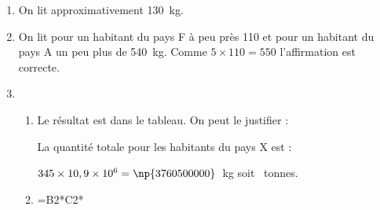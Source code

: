 \documentclass[10pt]{article}
\begin{document}
\begin{enumerate}
	\item %
On lit approximativement 130~kg.
	\item %
On lit pour un habitant du pays F à peu près 110 et pour un habitant du pays A un peu plus de 540~kg. Comme $5 \times 110 = 550$ l'affirmation est correcte.	
	\item %

%

	\begin{enumerate}
		\item  %
Le résultat est dans le tableau. On peut le justifier :

La quantité totale pour les habitants du pays X est :
		
$345 \times 10,9 \times 10^6 = \np{3760500000}$~kg soit ~tonnes.	
		\item %
		
\textsf{=B2*C2*}
	\end{enumerate}
\end{enumerate}
\end{document}
